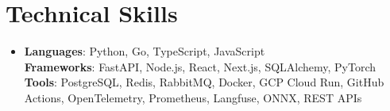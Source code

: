 \documentclass[letterpaper,11pt]{article}
\begin{document}
\section{Technical Skills}
\begin{itemize}[leftmargin=0.15in, label={}, topsep=0pt, itemsep=0pt, parsep=0pt, partopsep=0pt]
  \item{\fontsize{9.0pt}{9.25pt}\selectfont
   \textbf{Languages}{: Python, Go, TypeScript, JavaScript} \\
   \textbf{Frameworks}{: FastAPI, Node.js, React, Next.js, SQLAlchemy, PyTorch} \\
   \textbf{Tools}{: PostgreSQL, Redis, RabbitMQ, Docker, GCP Cloud Run, GitHub Actions, OpenTelemetry, Prometheus, Langfuse, ONNX, REST APIs} \\
  }
\end{itemize}
\end{document}
